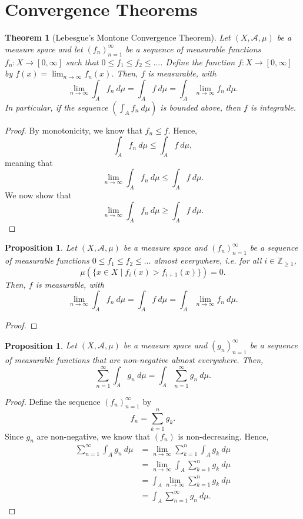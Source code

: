 \documentclass[a4paper, openany]{memoir}
\theoremstyle{definition}
\theoremstyle{plain}
\newtheorem{theorem}[definition]{Theorem}
\newtheorem{proposition}[definition]{Proposition}
\begin{document}
    \section{Convergence Theorems}
    \begin{theorem}[Lebesgue's Montone Convergence Theorem]
        Let $(X, \mathcal{A}, \mu)$ be a measure space and let $(f_n)_{n=1}^\infty$ be a sequence of measurable functions $f_n \colon X \to [0, \infty]$ such that $0 \leq f_1 \leq f_2 \leq \dots$. Define the function $f \colon X \to [0, \infty]$ by $f(x) = \lim_{n \to \infty} f_n(x)$. Then, $f$ is measurable, with
        \[\lim_{n \to \infty} \int_A f_n \ d\mu = \int_A f \ d\mu = \int_A \lim_{n \to \infty} f_n \ d\mu.\]
        In particular, if the sequence $(\int_A f_n \ d\mu)$ is bounded above, then $f$ is integrable.
    \end{theorem}
    \begin{proof}
        By monotonicity, we know that $f_n \leq f$. Hence,
        \[\int_A f_n \ d\mu \leq \int_A f \ d\mu,\]
        meaning that
        \[\lim_{n \to \infty} \int_A f_n \ d\mu \leq \int_A f \ d\mu.\]
        We now show that
        \[\lim_{n \to \infty} \int_A f_n \ d\mu \geq \int_A f \ d\mu.\]
    \end{proof}

    \begin{proposition}
        Let $(X, \mathcal{A}, \mu)$ be a measure space and $(f_n)_{n=1}^\infty$ be a sequence of measurable functions $0 \leq f_1 \leq f_2 \leq \dots$ almost everywhere, i.e. for all $i \in \mathbb{Z}_{\geq 1}$,
        \[\mu (\{x \in X \mid f_i(x) > f_{i+1}(x)\}) = 0.\]
        Then, $f$ is measurable, with
        \[\lim_{n \to \infty} \int_A f_n \ d\mu = \int_A f \ d\mu = \int_A \lim_{n \to \infty} f_n \ d\mu.\]
    \end{proposition}
    \begin{proof}
        
    \end{proof}

    \begin{proposition}
        Let $(X, \mathcal{A}, \mu)$ be a measure space and $(g_n)_{n=1}^\infty$ be a sequence of measurable functions that are non-negative almost everywhere. Then,
        \[\sum_{n=1}^\infty \int_A g_n \ d\mu = \int_A \sum_{n=1}^\infty g_n \ d\mu.\]
    \end{proposition}
    \begin{proof}
        Define the sequence $(f_n)_{n=1}^\infty$ by
        \[f_n = \sum_{k=1}^n g_k.\]
        Since $g_n$ are non-negative, we know that $(f_n)$ is non-decreasing. Hence,
        \begin{align*}
            \sum_{n=1}^\infty \int_A g_n \ d\mu &= \lim_{n \to \infty} \sum_{k=1}^n \int_A g_k \ d\mu \\
            &= \lim_{n \to \infty} \int_A \sum_{k=1}^n g_k \ d\mu \\
            &= \int_A \lim_{n \to \infty} \sum_{k=1}^n g_k \ d\mu \\
            &= \int_A \sum_{n=1}^\infty g_n \ d\mu.
        \end{align*}
    \end{proof}
\end{document}
